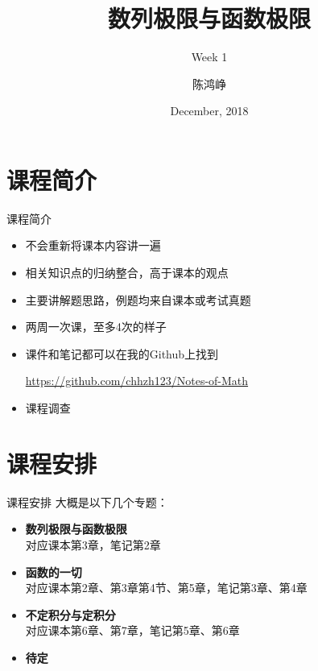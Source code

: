 \documentclass{myslide}
\title{数列极限与函数极限}
\subtitle{Week 1}
\author[chhzh123]{陈鸿峥}
\institute[]{\small\url{https://github.com/chhzh123/Notes-of-Math/blob/master/Mathematical_analysis/main.pdf}}
\date[Dec 1, 2018]{December, 2018}
\begin{document}
\begin{frame}
\titlepage
\end{frame}

\begin{frame}
\tableofcontents[subsectionstyle=show]
\end{frame}

\section{课程简介}
\begin{frame}
\sectionpage
\end{frame}

\begin{frame}{课程简介}
\begin{itemize}
	\item<1-> 不会重新将课本内容讲一遍
	\item<2-> 相关知识点的归纳整合，高于课本的观点
	\item<3-> 主要讲解题思路，例题均来自课本或考试真题
	\item<4-> 两周一次课，至多4次的样子
	\item<5-> 课件和笔记都可以在我的Github上找到
	\begin{center}
	\url{https://github.com/chhzh123/Notes-of-Math}
	\end{center}
	\item<6> 课程调查
\end{itemize}
\end{frame}

\section{课程安排}
\begin{frame}
\sectionpage
\end{frame}

\begin{frame}{课程安排}
大概是以下几个专题：
\begin{itemize}
	\item \textbf{数列极限与函数极限}\\
	对应课本第3章，笔记第2章
	\item \textbf{函数的一切}\\
	对应课本第2章、第3章第4节、第5章，笔记第3章、第4章
	\item \textbf{不定积分与定积分}\\
	对应课本第6章、第7章，笔记第5章、第6章
	\item \textbf{待定}
\end{itemize}
\end{frame}
\end{document}
